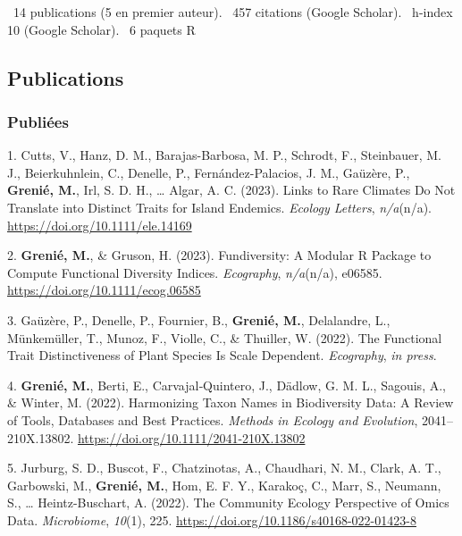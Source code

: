 \documentclass[10pt,a4paper,]{article}
\begin{document}
\faFile*~14 publications (5 en premier auteur). \faQuoteLeft~457
citations (Google Scholar). \faHSquare~h-index 10 (Google Scholar).
\faRProject~6 paquets R

\hypertarget{publications}{%
\subsection{Publications}\label{publications}}

\hypertarget{publiuxe9es}{%
\subsubsection{Publiées}\label{publiuxe9es}}

\hypertarget{bibliography}{}
\leavevmode{}%
1. Cutts, V., Hanz, D. M., Barajas-Barbosa, M. P., Schrodt, F.,
Steinbauer, M. J., Beierkuhnlein, C., Denelle, P., Fernández-Palacios,
J. M., Gaüzère, P., \textbf{Grenié, M.}, Irl, S. D. H., \ldots{} Algar,
A. C. (2023). Links to Rare Climates Do Not Translate into Distinct
Traits for Island Endemics. \emph{Ecology Letters}, \emph{n/a}(n/a).
\url{https://doi.org/10.1111/ele.14169}

\leavevmode{}%
2. \textbf{Grenié, M.}, \& Gruson, H. (2023). Fundiversity: A Modular R
Package to Compute Functional Diversity Indices. \emph{Ecography},
\emph{n/a}(n/a), e06585. \url{https://doi.org/10.1111/ecog.06585}

\leavevmode{}%
3. Gaüzère, P., Denelle, P., Fournier, B., \textbf{Grenié, M.},
Delalandre, L., Münkemüller, T., Munoz, F., Violle, C., \& Thuiller, W.
(2022). The Functional Trait Distinctiveness of Plant Species Is Scale
Dependent. \emph{Ecography}, \emph{in press}.

\leavevmode{}%
4. \textbf{Grenié, M.}, Berti, E., Carvajal‐Quintero, J., Dädlow, G. M.
L., Sagouis, A., \& Winter, M. (2022). Harmonizing Taxon Names in
Biodiversity Data: A Review of Tools, Databases and Best Practices.
\emph{Methods in Ecology and Evolution}, 2041--210X.13802.
\url{https://doi.org/10.1111/2041-210X.13802}

\leavevmode{}%
5. Jurburg, S. D., Buscot, F., Chatzinotas, A., Chaudhari, N. M., Clark,
A. T., Garbowski, M., \textbf{Grenié, M.}, Hom, E. F. Y., Karakoç, C.,
Marr, S., Neumann, S., \ldots{} Heintz-Buschart, A. (2022). The
Community Ecology Perspective of Omics Data. \emph{Microbiome},
\emph{10}(1), 225. \url{https://doi.org/10.1186/s40168-022-01423-8}
\end{document}
